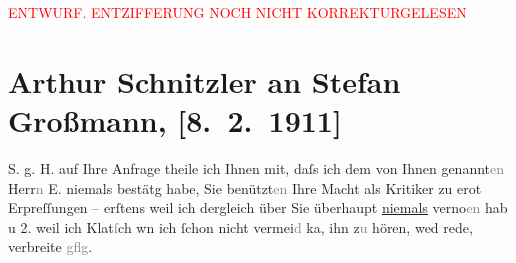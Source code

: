 
\begin{center}
            \textcolor{red}{ENTWURF. ENTZIFFERUNG NOCH NICHT KORREKTURGELESEN}
                      \end{center}
            
               \section[Arthur Schnitzler an Stefan Großmann, {[}8. 2. 1911{]}]{ Arthur Schnitzler an Stefan Großmann, {[}8. 2. 1911{]}}\nopagebreak{}\rehead{ }\begin{ledgroupsized}[t]{13cm}\normalsize\beginnumbering{} \toendnotes[C]{\smallbreak\pagebreak[2]} 
\pstart{}{\pb}S. g. H.\pend\pstart
           auf Ihre Anfrage theile ich Ihnen mit, daſs ich dem von Ihnen
                        genannt\textcolor{gray}{en} Herr\textcolor{gray}{n}{ }E. niemals bestätg habe, Sie
                        benützt\textcolor{gray}{en} Ihre Macht als Kritiker zu erot Erpreſſungen –
                    erſtens weil ich dergleich über Sie überhaupt \uline{niemals} verno{\geminationm}\textcolor{gray}{en} hab u 2. weil ich Klat\textcolor{gray}{ſ}ch wn ich ſchon
                    nicht vermei\textcolor{gray}{d} ka{\geminationn}, ihn
                        z\textcolor{gray}{u} hören, wed rede, verbreite
                    \textcolor{gray}{gflg}.\pend
           \endnumbering{}\end{ledgroupsized}  \newcommand{\dateiname}{L02006}\newcommand{\titel}{Arthur Schnitzler an Stefan Großmann, [8. 2. 1911]}\newcommand{\editorInnen}{Martin Anton Müller und Gerd-Hermann Susen}
      